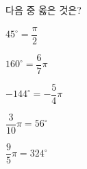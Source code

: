 다음 중 옳은 것은?
\begin{choicesii}{\rule[-3ex]{0pt}{8ex}$45^\circ=\dfrac{\pi}{2}$}{\rule[-3ex]{0pt}{8ex}$160^\circ=\dfrac{6}{7}\pi$}{\rule[-3ex]{0pt}{8ex}$-144^\circ=-\dfrac{5}{4}\pi$}{\rule[-3ex]{0pt}{8ex}$\dfrac{3}{10}\pi=56^\circ$}{\rule[-3ex]{0pt}{8ex}$\dfrac{9}{5}\pi=324^\circ$}\end{choicesii}
